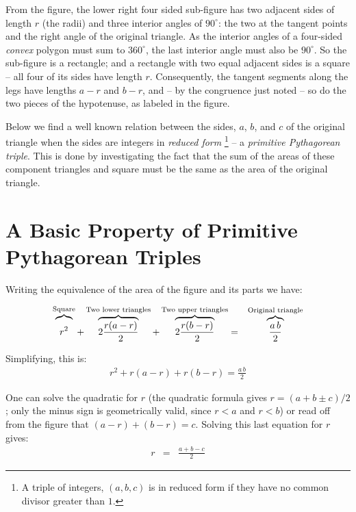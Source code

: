 \documentclass[12pt]{article}
\theoremstyle{plain}
\begin{document}
From the figure, the lower right four sided sub-figure has two adjacent sides
of length $r$ (the radii) and three interior angles of $90^\circ$: the two at
the tangent points and the right angle of the original triangle.
As the interior angles of a four-sided {\em convex\/}
polygon must sum to $360^\circ$, the last interior angle must also be $90^\circ$.
So the sub-figure is a rectangle; and a rectangle with two equal adjacent
sides is a square -- all four of its sides have length $r$.
Consequently, the tangent segments along the legs have lengths $a - r$ and
$b - r$, and -- by the congruence just noted -- so do the two pieces of the
hypotenuse, as labeled in the figure.

Below we find a well known relation between the sides, $a$, $b$, and $c$ of the
original triangle when the sides are integers in {\em reduced form\/}%
\footnote{A triple of integers, $(a, b, c)$ is in reduced form if 
they have no common divisor greater than $1$.}
-- a {\em primitive Pythagorean triple\/}.
This is done by investigating the fact that the sum of the areas
of these component triangles 
and square must be the same as the area of the original triangle. 

\section{A Basic Property of Primitive Pythagorean Triples}
Writing the equivalence of the area of the figure and its parts we have:

\begin{eqnarray}
    \overbrace{\vphantom{\frac{X^1}{X}}r^2}^{\text{Square}} 
    + \overbrace{2 \frac{r(a - r)}{2}}^{\text{Two lower triangles}} 
    + \overbrace{2 \frac{r(b-r)}{2}}^{\text{Two upper triangles}}  
    &=& \overbrace{\frac{a\, b}{2}}^{\text{Original triangle}}  
\end{eqnarray}

Simplifying, this is:
\begin{eqnarray}
r^2 + r(a - r) + r(b-r) = \frac{a\, b}{2} \label{area} 
\end{eqnarray}

One can solve the quadratic for $r$ (the quadratic formula gives
$r = (a + b \pm c)/2$; only the minus sign is geometrically valid, since
$r < a$ and $r < b$) or read off from the figure
that $(a-r) + (b-r) = c$. Solving this last equation for $r$ gives:
\begin{eqnarray}
  r & = & \frac{a + b - c}{2} \label{radius}
\end{eqnarray}
\end{document}
